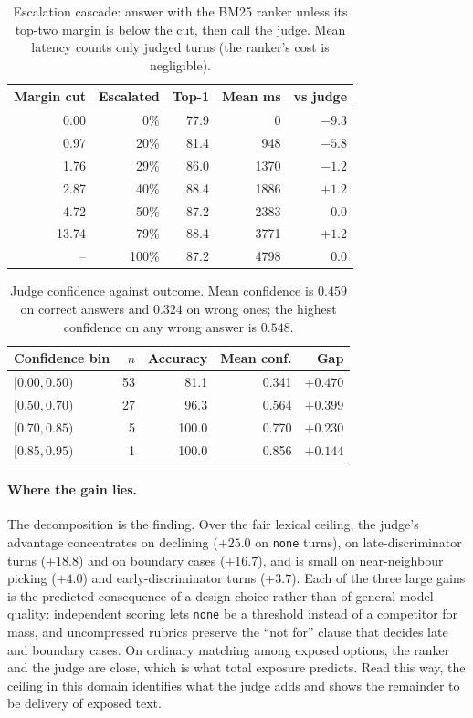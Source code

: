 \begin{table}[t]\centering\small
\caption{Escalation cascade: answer with the BM25 ranker unless its top-two margin is below the cut,
then call the judge. Mean latency counts only judged turns (the ranker's cost is negligible).}
\label{tab:routing-cascade}
\begin{tabular}{rrrrr}
\toprule
Margin cut & Escalated & Top-1 & Mean ms & vs judge \\
\midrule
0.00  & 0\%   & 77.9 & 0    & $-9.3$ \\
0.97  & 20\%  & 81.4 & 948  & $-5.8$ \\
1.76  & 29\%  & 86.0 & 1370 & $-1.2$ \\
2.87  & 40\%  & 88.4 & 1886 & $+1.2$ \\
4.72  & 50\%  & 87.2 & 2383 & $0.0$ \\
13.74 & 79\%  & 88.4 & 3771 & $+1.2$ \\
--    & 100\% & 87.2 & 4798 & $0.0$ \\
\bottomrule
\end{tabular}
\end{table}

\begin{table}[t]\centering\small
\caption{Judge confidence against outcome. Mean confidence is $0.459$ on correct answers and $0.324$
on wrong ones; the highest confidence on any wrong answer is $0.548$.}
\label{tab:routing-calib}
\begin{tabular}{lrrrr}
\toprule
Confidence bin & $n$ & Accuracy & Mean conf. & Gap \\
\midrule
$[0.00,0.50)$ & 53 & 81.1  & 0.341 & $+0.470$ \\
$[0.50,0.70)$ & 27 & 96.3  & 0.564 & $+0.399$ \\
$[0.70,0.85)$ & 5  & 100.0 & 0.770 & $+0.230$ \\
$[0.85,0.95)$ & 1  & 100.0 & 0.856 & $+0.144$ \\
\bottomrule
\end{tabular}
\end{table}

\paragraph{Where the gain lies.} The decomposition is the finding. Over the fair lexical ceiling, the judge's advantage concentrates on declining ($+25.0$ on \texttt{none} turns), on late-discriminator turns ($+18.8$) and on boundary cases ($+16.7$), and is small on near-neighbour picking ($+4.0$) and early-discriminator turns ($+3.7$). Each of the three large gains is the predicted consequence of a design choice rather than of general model quality: independent scoring lets \texttt{none} be a threshold instead of a competitor for mass, and uncompressed rubrics preserve the ``not for'' clause that decides late and boundary cases. On ordinary matching among exposed options, the ranker and the judge are close, which is what total exposure predicts. Read this way, the ceiling in this domain identifies what the judge adds and shows the remainder to be delivery of exposed text.

